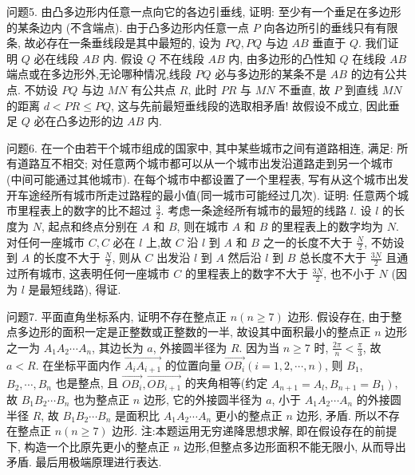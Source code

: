 问题5. 由凸多边形内任意一点向它的各边引垂线, 证明: 至少有一个垂足在多边形的某条边内 (不含端点).
由于凸多边形内任意一点 $P$ 向各边所引的垂线只有有限条, 故必存在一条垂线段是其中最短的, 设为 $P Q, P Q$ 与边 $A B$ 垂直于 $Q$. 我们证明 $Q$ 必在线段 $A B$ 内.
假设 $Q$ 不在线段 $A B$ 内, 由多边形的凸性知 $Q$ 在线段 $A B$ 端点或在多边形外,无论哪种情况,线段 $P Q$ 必与多边形的某条不是 $A B$ 的边有公共点.
不妨设 $P Q$ 与边 $M N$ 有公共点 $R$, 此时 $P R$ 与 $M N$ 不垂直, 故 $P$ 到直线 $M N$ 的距离 $d<P R \leqslant P Q$, 这与先前最短垂线段的选取相矛盾! 故假设不成立, 因此垂足 $Q$ 必在凸多边形的边 $A B$ 内.



问题6. 在一个由若干个城市组成的国家中, 其中某些城市之间有道路相连, 满足: 所有道路互不相交; 对任意两个城市都可以从一个城市出发沿道路走到另一个城市 (中间可能通过其他城市). 在每个城市中都设置了一个里程表, 写有从这个城市出发开车途经所有城市所走过路程的最小值(同一城市可能经过几次). 证明: 任意两个城市里程表上的数字的比不超过 $\frac{3}{2}$. 
考虑一条途经所有城市的最短的线路 $l$. 设 $l$ 的长度为 $N$, 起点和终点分别在 $A$ 和 $B$, 则在城市 $A$ 和 $B$ 的里程表上的数字均为 $N$. 对任何一座城市 $C, C$ 必在 $l$ 上,故 $C$ 沿 $l$ 到 $A$ 和 $B$ 之一的长度不大于 $\frac{N}{2}$, 不妨设到 $A$ 的长度不大于 $\frac{N}{2}$, 则从 $C$ 出发沿 $l$ 到 $A$ 然后沿 $l$ 到 $B$ 总长度不大于 $\frac{3 N}{2}$ 且通过所有城市, 这表明任何一座城市 $C$ 的里程表上的数字不大于 $\frac{3 N}{2}$, 也不小于 $N$ (因为 $l$ 是最短线路), 得证.



问题7. 平面直角坐标系内, 证明不存在整点正 $n(n \geqslant 7)$ 边形.
假设存在, 由于整点多边形的面积一定是正整数或正整数的一半, 故设其中面积最小的整点正 $n$ 边形之一为 $A_1 A_2 \cdots A_n$, 其边长为 $a$, 外接圆半径为 $R$.
因为当 $n \geqslant 7$ 时, $\frac{2 \pi}{n}<\frac{\pi}{3}$, 故 $a<R$.
在坐标平面内作 $\overrightarrow{A_i A_{i+1}}$ 的位置向量 $\overrightarrow{O B_i}(i=1,2, \cdots, n)$, 则 $B_1$, $B_2, \cdots, B_n$ 也是整点, 且 $\overrightarrow{O B_i}, \overrightarrow{O B_{i+1}}$ 的夹角相等(约定 $A_{n+1}=A_l, B_{n+1}= \left.B_1\right)$, 故 $B_1 B_2 \cdots B_n$ 也为整点正 $n$ 边形, 它的外接圆半径为 $a$, 小于 $A_1 A_2 \cdots A_n$ 的外接圆半径 $R$, 故 $B_1 B_2 \cdots B_n$ 是面积比 $A_1 A_2 \cdots A_n$ 更小的整点正 $n$ 边形, 矛盾.
所以不存在整点正 $n(n \geqslant 7)$ 边形.
注:本题运用无穷递降思想求解, 即在假设存在的前提下, 构造一个比原先更小的整点正 $n$ 边形,但整点多边形面积不能无限小, 从而导出矛盾.
最后用极端原理进行表达.



